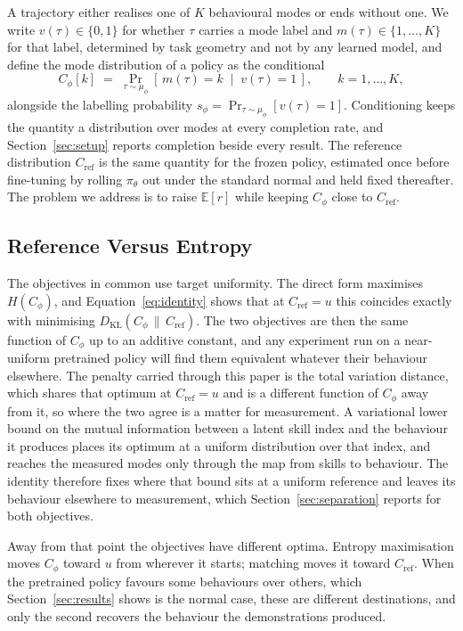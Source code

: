\documentclass[preprint,12pt]{elsarticle}
\begin{document}
A trajectory either realises one of $K$ behavioural modes or ends without one.
We write $v(\tau) \in \{0, 1\}$ for whether $\tau$ carries a mode label and
$m(\tau) \in \{1, \dots, K\}$ for that label, determined by task geometry and not
by any learned model, and define the mode distribution of a policy as the
conditional
\begin{equation}\label{eq:cphi}
  C_\phi[k] \;=\; \Pr_{\tau \sim \mu_\phi}\!\left[\, m(\tau) = k
  \;\middle|\; v(\tau) = 1 \,\right],
  \qquad k = 1, \dots, K ,
\end{equation}
alongside the labelling probability
$s_\phi = \Pr_{\tau \sim \mu_\phi}\!\left[v(\tau) = 1\right]$. Conditioning keeps
the quantity a distribution over modes at every completion rate, and
Section~\ref{sec:setup} reports completion beside every result.
The reference distribution $C_{\mathrm{ref}}$ is the same quantity for the frozen
policy, estimated once before fine-tuning by rolling $\pi_\theta$ out under the
standard normal and held fixed thereafter. The problem we address is to raise
$\mathbb{E}[r]$ while keeping $C_\phi$ close to $C_{\mathrm{ref}}$.

\subsection{Reference Versus Entropy}\label{sec:why}

The objectives in common use target uniformity. The direct form
maximises $H(C_\phi)$, and Equation~\ref{eq:identity} shows that at
$C_{\mathrm{ref}} = u$ this coincides exactly with minimising
$D_{\mathrm{KL}}(C_\phi \,\|\, C_{\mathrm{ref}})$. The two objectives are then
the same function of $C_\phi$ up to an additive constant, and any experiment run
on a near-uniform pretrained policy will find them equivalent whatever their
behaviour elsewhere. The penalty carried through this paper is the total
variation distance, which shares that optimum at $C_{\mathrm{ref}} = u$ and is
a different function of $C_\phi$ away from it, so where the two agree is a
matter for measurement. A variational lower bound on the mutual information between
a latent skill index and the behaviour it produces places its optimum at a
uniform distribution over that index, and reaches the measured modes only
through the map from skills to behaviour. The identity therefore fixes where
that bound sits at a uniform reference and leaves its behaviour elsewhere to
measurement, which Section~\ref{sec:separation} reports for both objectives.

Away from that point the objectives have different optima. Entropy
maximisation moves $C_\phi$ toward $u$ from wherever it starts; matching moves it
toward $C_{\mathrm{ref}}$. When the pretrained policy favours some behaviours over
others, which Section~\ref{sec:results} shows is the normal case, these are
different destinations, and only the second recovers the behaviour the
demonstrations produced.
\end{document}
